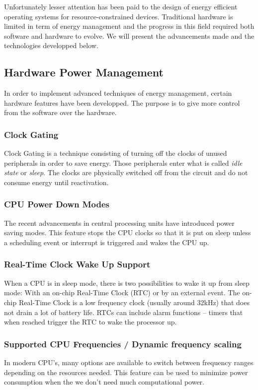 Unfortunately lesser attention has been paid to the design of energy efficient operating systems for resource-constrained devices.
Traditional hardware is limited in term of energy management and the progress in this field required both software and hardware to evolve.
We will present the advancements made and the technologies developped below.


\subsection{Hardware Power Management}
In order to implement advanced techniques of energy management, certain hardware features have been developped.
The purpose is to give more control from the software over the hardware.

\subsubsection{Clock Gating}
Clock Gating is a technique consisting of turning off the clocks of unused peripherals in order to save energy.
Those peripherals enter what is called \textit{idle state} or \textit{sleep}.
The clocks are physically switched off from the circuit and do not consume energy until reactivation.

\subsubsection{CPU Power Down Modes}
The recent advancements in central processing units have introduced power saving modes.
This feature stops the CPU clocks so that it is put on sleep unless a scheduling event or interrupt is triggered and wakes the CPU up.

\subsubsection{Real-Time Clock Wake Up Support}
When a CPU is in sleep mode, there is two possibilities to wake it up from sleep mode:
With an on-chip Real-Time Clock (RTC) or by an external event.
The on-chip Real-Time Clock is a low frequency clock (usually around 32kHz) that does not drain a lot of battery life.
RTCs can include alarm functions – timers that when reached trigger the RTC to wake the processor up.

\subsubsection{Supported CPU Frequencies / Dynamic frequency scaling}
In modern CPU's, many options are available to switch between frequency ranges depending on the resources needed.
This feature can be used to minimize power consumption when the we don't need much computational power.

